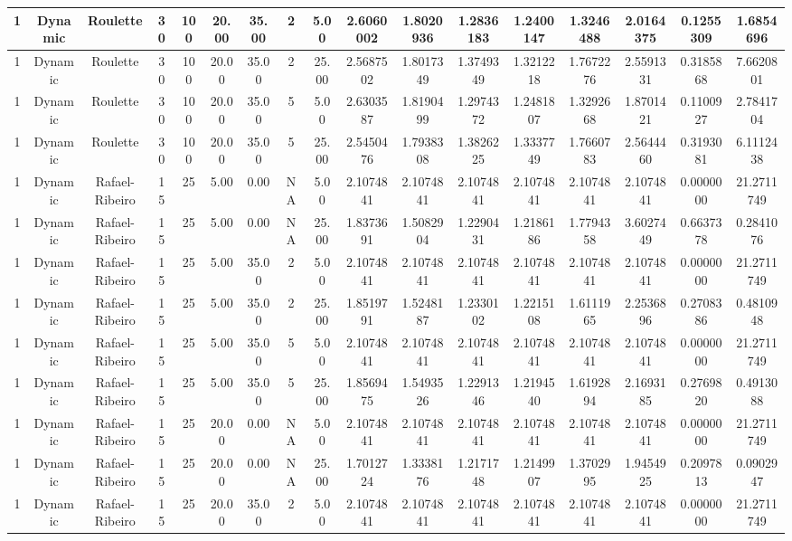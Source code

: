 \begin{longtable}{ | c | c | c | c | c | c | c | c | c | c | c | c | c | c | c | c | c | }
	\hline
	1	&	Dynamic	&	Roulette	&	30	&	100	&	20.00	&	35.00	&	2	&	5.00	&	2.6060002	&	1.8020936	&	1.2836183	&	1.2400147	&	1.3246488	&	2.0164375	&	0.1255309	&	1.6854696 \\
	\hline
	1	&	Dynamic	&	Roulette	&	30	&	100	&	20.00	&	35.00	&	2	&	25.00	&	2.5687502	&	1.8017349	&	1.3749349	&	1.3212218	&	1.7672276	&	2.5591331	&	0.3185868	&	7.6620801 \\
	\hline
	1	&	Dynamic	&	Roulette	&	30	&	100	&	20.00	&	35.00	&	5	&	5.00	&	2.6303587	&	1.8190499	&	1.2974372	&	1.2481807	&	1.3292668	&	1.8701421	&	0.1100927	&	2.7841704 \\
	\hline
	1	&	Dynamic	&	Roulette	&	30	&	100	&	20.00	&	35.00	&	5	&	25.00	&	2.5450476	&	1.7938308	&	1.3826225	&	1.3337749	&	1.7660783	&	2.5644460	&	0.3193081	&	6.1112438 \\
	\hline
	1	&	Dynamic	&	Rafael-Ribeiro	&	15	&	25	&	5.00	&	0.00	&	NA	&	5.00	&	2.1074841	&	2.1074841	&	2.1074841	&	2.1074841	&	2.1074841	&	2.1074841	&	0.0000000	&	21.2711749 \\
	\hline
	1	&	Dynamic	&	Rafael-Ribeiro	&	15	&	25	&	5.00	&	0.00	&	NA	&	25.00	&	1.8373691	&	1.5082904	&	1.2290431	&	1.2186186	&	1.7794358	&	3.6027449	&	0.6637378	&	0.2841076 \\
	\hline
	1	&	Dynamic	&	Rafael-Ribeiro	&	15	&	25	&	5.00	&	35.00	&	2	&	5.00	&	2.1074841	&	2.1074841	&	2.1074841	&	2.1074841	&	2.1074841	&	2.1074841	&	0.0000000	&	21.2711749 \\
	\hline
	1	&	Dynamic	&	Rafael-Ribeiro	&	15	&	25	&	5.00	&	35.00	&	2	&	25.00	&	1.8519791	&	1.5248187	&	1.2330102	&	1.2215108	&	1.6111965	&	2.2536896	&	0.2708386	&	0.4810948 \\
	\hline
	1	&	Dynamic	&	Rafael-Ribeiro	&	15	&	25	&	5.00	&	35.00	&	5	&	5.00	&	2.1074841	&	2.1074841	&	2.1074841	&	2.1074841	&	2.1074841	&	2.1074841	&	0.0000000	&	21.2711749 \\
	\hline
	1	&	Dynamic	&	Rafael-Ribeiro	&	15	&	25	&	5.00	&	35.00	&	5	&	25.00	&	1.8569475	&	1.5493526	&	1.2291346	&	1.2194540	&	1.6192894	&	2.1693185	&	0.2769820	&	0.4913088 \\
	\hline
	1	&	Dynamic	&	Rafael-Ribeiro	&	15	&	25	&	20.00	&	0.00	&	NA	&	5.00	&	2.1074841	&	2.1074841	&	2.1074841	&	2.1074841	&	2.1074841	&	2.1074841	&	0.0000000	&	21.2711749 \\
	\hline
	1	&	Dynamic	&	Rafael-Ribeiro	&	15	&	25	&	20.00	&	0.00	&	NA	&	25.00	&	1.7012724	&	1.3338176	&	1.2171748	&	1.2149907	&	1.3702995	&	1.9454925	&	0.2097813	&	0.0902947 \\
	\hline
	1	&	Dynamic	&	Rafael-Ribeiro	&	15	&	25	&	20.00	&	35.00	&	2	&	5.00	&	2.1074841	&	2.1074841	&	2.1074841	&	2.1074841	&	2.1074841	&	2.1074841	&	0.0000000	&	21.2711749 \\

\end{longtable}

